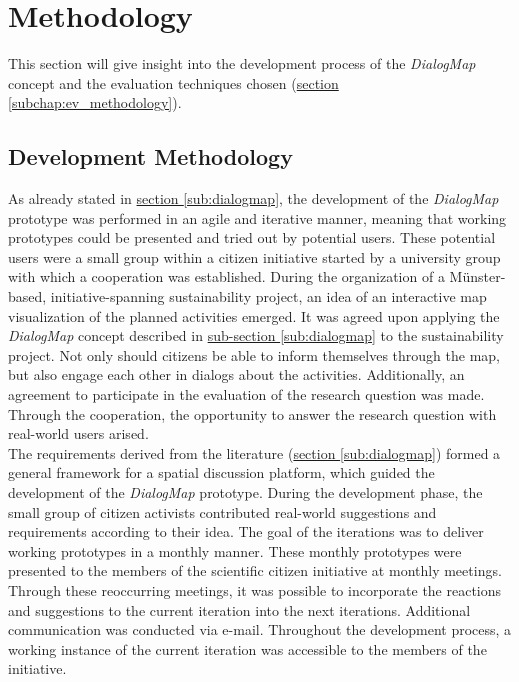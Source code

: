 \section{Methodology}
\label{chap:methodology}
This section will give insight into the development process of the \textit{DialogMap} concept and the evaluation techniques chosen (\hyperref[subchap:ev_methodology]{section \ref{subchap:ev_methodology}}).

\subsection{Development Methodology}
As already stated in \hyperref[sub:dialogmap]{section \ref{sub:dialogmap}}, the development of the \textit{DialogMap} prototype was performed in an agile and iterative manner, meaning that working prototypes could be presented and tried out by potential users. These potential users were a small group within a citizen initiative started by a university group with which a cooperation was established. During the organization of a Münster-based, initiative-spanning sustainability project, an idea of an interactive map visualization of the planned activities emerged. It was agreed upon applying the \textit{DialogMap} concept described in \hyperref[sub:dialogmap]{sub-section \ref{sub:dialogmap}} to the sustainability project. Not only should citizens be able to inform themselves through the map, but also engage each other in dialogs about the activities. Additionally, an agreement to participate in the evaluation of the research question was made. Through the cooperation, the opportunity to answer the research question with real-world users arised.\\
The requirements derived from the literature (\hyperref[sub:dialogmap]{section \ref{sub:dialogmap}}) formed a general framework for a spatial discussion platform, which guided the development of the \textit{DialogMap} prototype. During the development phase, the small group of citizen activists contributed real-world suggestions and requirements according to their idea. The goal of the iterations was to deliver working prototypes in a monthly manner. These monthly prototypes were presented to the members of the scientific citizen initiative at monthly meetings. Through these reoccurring meetings, it was possible to incorporate the reactions and suggestions to the current iteration into the next iterations. Additional communication was conducted via e-mail. Throughout the development process, a working instance of the current iteration was accessible to the members of the initiative. %

